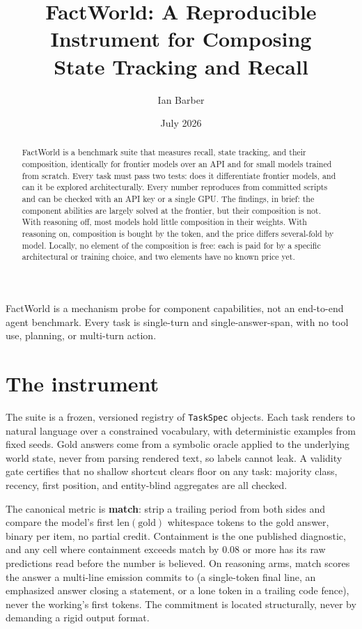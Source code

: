 \documentclass[11pt]{article}
\title{\textbf{FactWorld: A Reproducible Instrument for Composing\\State Tracking and Recall}}
\author{Ian Barber}
\date{July 2026}
\newcommand{\code}[1]{\texttt{#1}}
\begin{document}
\maketitle

\begin{abstract}
FactWorld is a benchmark suite that measures recall, state tracking, and their composition,
identically for frontier models over an API and for small models trained from scratch. Every
task must pass two tests: does it differentiate frontier models, and can it be explored
architecturally. Every number reproduces from committed scripts and can be checked with an API
key or a single GPU. The findings, in brief: the component abilities are largely solved at the
frontier, but their composition is not. With reasoning off, most models hold little
composition in their weights. With reasoning on, composition is bought by the token, and the
price differs several-fold by model. Locally, no element of the composition is free: each is
paid for by a specific architectural or training choice, and two elements have no known price
yet.
\end{abstract}

FactWorld is a mechanism probe for component capabilities, not an end-to-end agent benchmark.
Every task is single-turn and single-answer-span, with no tool use, planning, or multi-turn
action.

\section{The instrument}

The suite is a frozen, versioned registry of \code{TaskSpec} objects. Each task renders to
natural language over a constrained vocabulary, with deterministic examples from fixed seeds.
Gold answers come from a symbolic oracle applied to the underlying world state, never from
parsing rendered text, so labels cannot leak. A validity gate certifies that no shallow
shortcut clears floor on any task: majority class, recency, first position, and entity-blind
aggregates are all checked.

The canonical metric is \textbf{match}: strip a trailing period from both sides and compare
the model's first $\mathrm{len}(\mathrm{gold})$ whitespace tokens to the gold answer, binary
per item, no partial credit. Containment is the one published diagnostic, and any cell where
containment exceeds match by 0.08 or more has its raw predictions read before the number is
believed. On reasoning arms, match scores the answer a multi-line emission commits to (a
single-token final line, an emphasized answer closing a statement, or a lone token in a
trailing code fence), never the working's first tokens. The commitment is located
structurally, never by demanding a rigid output format.
\end{document}
